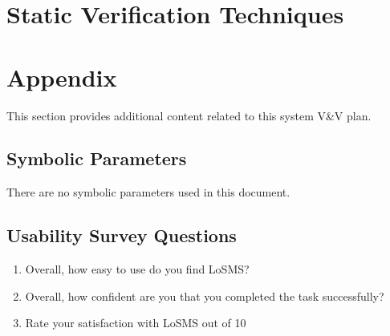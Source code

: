 \documentclass[12pt, titlepage]{article}
\newcommand{\famname}{LoSMS} %
\begin{document}

\section{Static Verification Techniques} \label{StaticVerTechniques}


\newpage
				




\newpage

\section{Appendix}

This section provides additional content related to this system V\&V plan.

\subsection{Symbolic Parameters}

There are no symbolic parameters used in this document.

\subsection{Usability Survey Questions} \label{UsabilityTesting}

\begin{enumerate}
	\item Overall, how easy to use do you find \famname{}? 
	\item Overall, how confident are you that you completed the task 
	successfully? 
	\item Rate your satisfaction with \famname{} out of 10
	
\end {enumerate}
\end{document}
